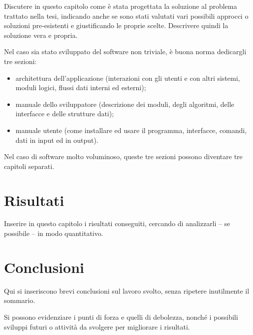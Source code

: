 
Discutere in questo capitolo come è stata progettata la soluzione al problema trattato nella tesi, indicando anche se sono stati valutati vari possibili approcci o soluzioni pre-esistenti e giustificando le proprie scelte. Descrivere quindi la soluzione vera e propria.

Nel caso sia stato sviluppato del software non triviale, è buona norma dedicargli tre sezioni:
\begin{itemize}
\item architettura dell'applicazione (interazioni con gli utenti e con altri sistemi, moduli logici, flussi dati interni ed esterni);
\item manuale dello sviluppatore (descrizione dei moduli, degli algoritmi, delle interfacce e delle strutture dati);
\item manuale utente (come installare ed usare il programma, interfacce, comandi, dati in input ed in output).
\end{itemize}
Nel caso di software molto voluminoso, queste tre sezioni possono diventare tre capitoli separati.

\chapter{Risultati}

Inserire in questo capitolo i risultati conseguiti, cercando di analizzarli -- se possibile -- in modo quantitativo.


\chapter{Conclusioni}

Qui si inseriscono brevi conclusioni sul lavoro svolto, senza ripetere inutilmente il sommario.

Si possono evidenziare i punti di forza e quelli di debolezza, nonché i possibili sviluppi futuri o attività da svolgere per migliorare i risultati.